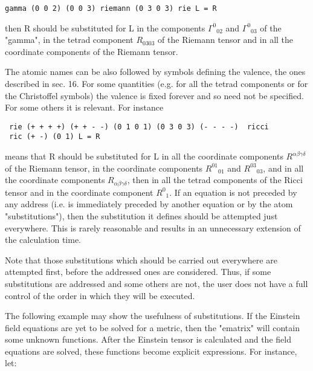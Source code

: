 \bigskip

\begin{verbatim}
gamma (0 0 2) (0 0 3) riemann (0 3 0 3) rie L = R
\end{verbatim}

\bigskip

\noindent then R should be substituted for L in the components ${\Gamma^0}_{0
2}$ and ${\Gamma^0}_{0 3}$ of the "gamma", in the tetrad component $R_{0 3 0
3}$ of the Riemann tensor and in all the coordinate components  of  the
     Riemann tensor.

The atomic names can be also followed by symbols defining  the  valence,  the
ones described in sec. 16. For some
     quantities (e.g. for all the tetrad components  or  for  the
     Christoffel  symbols)  the  valence  is fixed forever and so
     need not be specified. For some others it is  relevant.  For
     instance

\bigskip

\begin{verbatim}
 rie (+ + + +) (+ + - -) (0 1 0 1) (0 3 0 3) (- - - -)  ricci
 ric (+ -) (0 1) L = R
\end{verbatim}

\bigskip

\noindent  means that R should be substituted for L in all the  coordinate
components $R^{\alpha \beta \gamma \delta}$ of the Riemann tensor, in the
coordinate components ${R^{0 1}}_{0 1}$ and ${R^{0 3}}_{0 3}$, and in all the
coordinate components $R_{\alpha \beta \gamma \delta}$, then in all the tetrad
components of the Ricci  tensor  and  in  the  coordinate component ${R^0}_1$.
If an equation is not preceded by any address (i.e. is immediately
     preceded  by another equation or by the atom "substitutions"),
     then the substitution it defines should  be  attempted  just
     everywhere.   This  is  rarely  reasonable  and  results  in
     an unnecessary extension of the calculation time.

Note that those substitutions which should be carried out
     everywhere  are  attempted  first, before the addressed ones
     are considered. Thus, if some  substitutions  are  addressed
and  some others are not, the user does not have a full control of the order in
which they will be executed.

The following example may show the usefulness  of  substitutions.  If  the
Einstein field equations are yet to be solved for a metric, then the "ematrix"
will contain some  unknown functions. After the Einstein tensor is calculated
and the field equations are solved, these functions  become  explicit
expressions. For instance, let:

